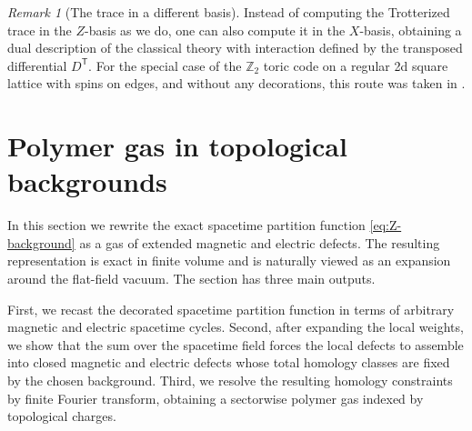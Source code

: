\documentclass[dvipsnames,a4paper]{article}
\numberwithin{equation}{section}
\theoremstyle{definition}
\theoremstyle{remark}
\newtheorem{remark}[theorem]{Remark}
\begin{document}
\begin{remark}[The trace in a different basis]
	Instead of computing the Trotterized trace in the $Z$-basis as we do, one can also compute it in the $X$-basis, obtaining a dual description of the classical theory with interaction defined by the transposed differential $D^\mathsf{T}$. For the special case of the $\mathbb Z_2$ toric code on a regular 2d square lattice with spins on edges, and without any decorations, this route was taken in \cite{Timmerman:2022uin}.
\end{remark}





\section{Polymer gas in topological backgrounds}
\label{sec:fixed-charge-polymer-gas}

In this section we rewrite the exact spacetime partition function
\eqref{eq:Z-background} as a gas of extended magnetic and electric defects. The resulting
representation is exact in finite volume and is naturally viewed as an expansion around the
flat-field vacuum. The section has three main outputs.

First, we recast the decorated spacetime partition function in terms of arbitrary magnetic
and electric spacetime cycles. Second, after expanding the local weights, we show that the
sum over the spacetime field forces the local defects to assemble into closed magnetic and
electric defects whose total homology classes are fixed by the chosen background. Third, we
resolve the resulting homology constraints by finite Fourier transform, obtaining a
sectorwise polymer gas indexed by topological charges.
\end{document}
